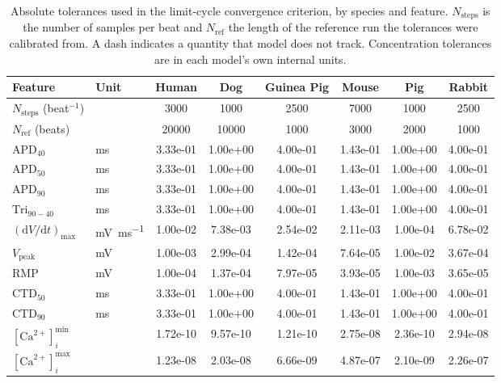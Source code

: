 \begin{table}[t]
\centering
\caption{Absolute tolerances used in the limit-cycle convergence criterion, by species and feature. $N_{\mathrm{steps}}$ is the number of samples per beat and $N_{\mathrm{ref}}$ the length of the reference run the tolerances were calibrated from. A dash indicates a quantity that model does not track. Concentration tolerances are in each model's own internal units.}
\label{tab:supp-tolerances}
\footnotesize
\begin{tabular}{l l S S S S S S}
\toprule
\textbf{Feature} & \textbf{Unit} & {\textbf{Human}} & {\textbf{Dog}} & {\textbf{Guinea Pig}} & {\textbf{Mouse}} & {\textbf{Pig}} & {\textbf{Rabbit}} \\
\midrule
$N_{\mathrm{steps}}$ (beat$^{-1}$) & & {3000} & {1000} & {2500} & {7000} & {1000} & {2500} \\
$N_{\mathrm{ref}}$ (beats) & & {20000} & {10000} & {1000} & {3000} & {2000} & {1000} \\
\midrule
$\mathrm{APD}_{40}$ & \si{\milli\second} & 3.33e-01 & 1.00e+00 & 4.00e-01 & 1.43e-01 & 1.00e+00 & 4.00e-01 \\
$\mathrm{APD}_{50}$ & \si{\milli\second} & 3.33e-01 & 1.00e+00 & 4.00e-01 & 1.43e-01 & 1.00e+00 & 4.00e-01 \\
$\mathrm{APD}_{90}$ & \si{\milli\second} & 3.33e-01 & 1.00e+00 & 4.00e-01 & 1.43e-01 & 1.00e+00 & 4.00e-01 \\
$\mathrm{Tri}_{90-40}$ & \si{\milli\second} & 3.33e-01 & 1.00e+00 & 4.00e-01 & 1.43e-01 & 1.00e+00 & 4.00e-01 \\
$(\mathrm{d}V/\mathrm{d}t)_{\max}$ & \si{\milli\volt\per\milli\second} & 1.00e-02 & 7.38e-03 & 2.54e-02 & 2.11e-03 & 1.00e-04 & 6.78e-02 \\
$V_{\mathrm{peak}}$ & \si{\milli\volt} & 1.00e-03 & 2.99e-04 & 1.42e-04 & 7.64e-05 & 1.00e-02 & 3.67e-04 \\
$\mathrm{RMP}$ & \si{\milli\volt} & 1.00e-04 & 1.37e-04 & 7.97e-05 & 3.93e-05 & 1.00e-03 & 3.65e-05 \\
$\mathrm{CTD}_{50}$ & \si{\milli\second} & 3.33e-01 & 1.00e+00 & 4.00e-01 & 1.43e-01 & 1.00e+00 & 4.00e-01 \\
$\mathrm{CTD}_{90}$ & \si{\milli\second} & 3.33e-01 & 1.00e+00 & 4.00e-01 & 1.43e-01 & 1.00e+00 & 4.00e-01 \\
\midrule
$[\mathrm{Ca}^{2+}]_{i}^{\min}$ & & 1.72e-10 & 9.57e-10 & 1.21e-10 & 2.75e-08 & 2.36e-10 & 2.94e-08 \\
$[\mathrm{Ca}^{2+}]_{i}^{\max}$ & & 1.23e-08 & 2.03e-08 & 6.66e-09 & 4.87e-07 & 2.10e-09 & 2.26e-07 \\

\end{tabular}
\end{table}
